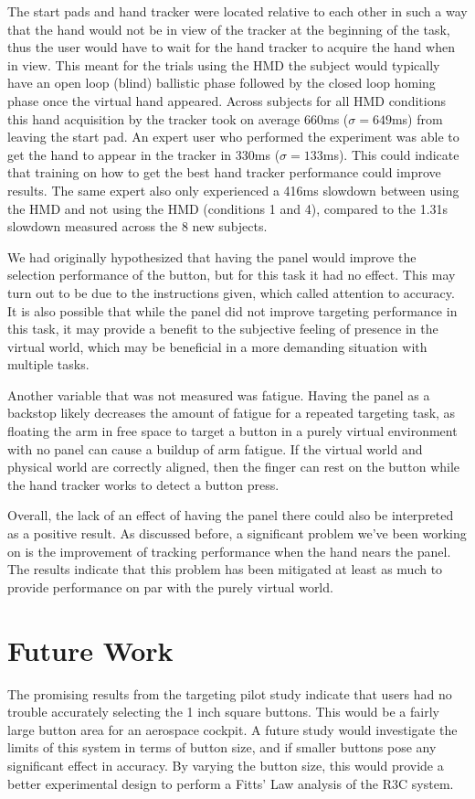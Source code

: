 The start pads and hand tracker were located relative to each other in such a way that the hand would not be in view of the tracker at the beginning of the task, thus the user would have to wait for the hand tracker to acquire the hand when in view.
This meant for the trials using the HMD the subject would typically have an open loop (blind) ballistic phase followed by the closed loop homing phase once the virtual hand appeared.
Across subjects for all HMD conditions this hand acquisition by the tracker took on average 660ms ($\sigma = 649$ms) from leaving the start pad.
An expert user who performed the experiment was able to get the hand to appear in the tracker in 330ms ($\sigma = 133$ms).
This could indicate that training on how to get the best hand tracker performance could improve results.
The same expert also only experienced a 416ms slowdown between using the HMD and not using the HMD (conditions 1 and 4), compared to the 1.31s slowdown measured across the 8 new subjects.

We had originally hypothesized that having the panel would improve the selection performance of the button, but for this task it had no effect.
This may turn out to be due to the instructions given, which called attention to accuracy.
It is also possible that while the panel did not improve targeting performance in this task, it may provide a benefit to the subjective feeling of presence in the virtual world, which may be beneficial in a more demanding situation with multiple tasks.

Another variable that was not measured was fatigue.
Having the panel as a backstop likely decreases the amount of fatigue for a repeated targeting task, as floating the arm in free space to target a button in a purely virtual environment with no panel can cause a buildup of arm fatigue.
If the virtual world and physical world are correctly aligned, then the finger can rest on the button while the hand tracker works to detect a button press.

Overall, the lack of an effect of having the panel there could also be interpreted as a positive result.
As discussed before, a significant problem we’ve been working on is the improvement of tracking performance when the hand nears the panel.
The results indicate that this problem has been mitigated at least as much to provide performance on par with the purely virtual world.

\section{Future Work}
The promising results from the targeting pilot study indicate that users had no trouble accurately selecting the 1 inch square buttons.
This would be a fairly large button area for an aerospace cockpit.
A future study would investigate the limits of this system in terms of button size, and if smaller buttons pose any significant effect in accuracy.
By varying the button size, this would provide a better experimental design to perform a Fitts’ Law analysis of the R3C system.

